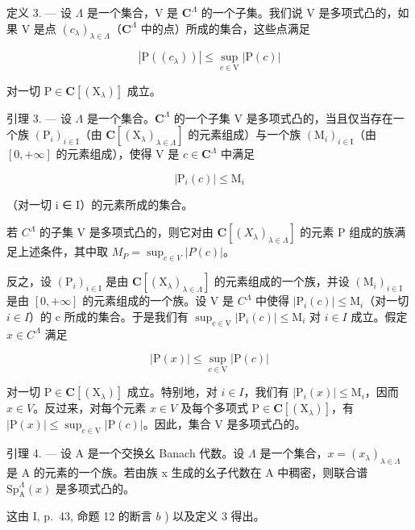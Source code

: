 定义 3. --- 设 \(\Lambda\) 是一个集合，V 是 \(\mathbf{C}^{\Lambda}\) 的一个子集。我们说 V 是多项式凸的，如果 V 是点 \((c_{\lambda})_{\lambda \in \Lambda}\)（\(\mathbf{C}^{\Lambda}\) 中的点）所成的集合，这些点满足

\[
| \mathrm{P} ((c _ {\lambda})) | \leqslant \sup _ {c \in \mathrm{V}} | \mathrm{P} (c) |
\]

对一切 \(\mathrm{P}\in \mathbf{C}[(\mathrm{X}_{\lambda})]\) 成立。

引理 3. --- 设 \(\Lambda\) 是一个集合。\(\mathbf{C}^{\Lambda}\) 的一个子集 V 是多项式凸的，当且仅当存在一个族 \((\mathrm{P}_i)_{i\in \mathrm{I}}\)（由 \(\mathbf{C}[(\mathrm{X}_{\lambda})_{\lambda \in \Lambda}]\) 的元素组成）与一个族 \((\mathrm{M}_i)_{i\in \mathrm{I}}\)（由 \([0, +\infty]\) 的元素组成），使得 V 是 \(c\in \mathbf{C}^{\Lambda}\) 中满足

\[
| \mathrm{P} _ {i} (c) | \leqslant \mathrm{M} _ {i}
\]

（对一切 i ∈ I）的元素所成的集合。

若 \(C^{\Lambda}\) 的子集 V 是多项式凸的，则它对由 \(\mathbf{C}[(X_{\lambda})_{\lambda\in\Lambda}]\) 的元素 P 组成的族满足上述条件，其中取 \(M_{P}=\sup_{c\in V}|P(c)|\)。

反之，设 \((\mathrm{P}_{i})_{i\in\mathrm{I}}\) 是由 \(\mathbf{C}[(\mathrm{X}_{\lambda})_{\lambda\in\Lambda}]\) 的元素组成的一个族，并设 \((\mathrm{M}_{i})_{i\in\mathrm{I}}\) 是由 \([0,+\infty]\) 的元素组成的一个族。设 V 是 \(C^{\Lambda}\) 中使得 \(|\mathrm{P}_{i}(c)|\leqslant\mathrm{M}_{i}\)（对一切 \(i\in I\)）的 c 所成的集合。于是我们有 \(\sup_{c\in\mathrm{V}}|\mathrm{P}_{i}(c)|\leqslant\mathrm{M}_{i}\) 对 \(i\in I\) 成立。假定 \(x\in C^{\Lambda}\) 满足

\[
| \mathrm{P} (x) | \leqslant \sup _ {c \in \mathrm{V}} | \mathrm{P} (c) |
\]

对一切 \(\mathrm{P}\in\mathbf{C}[(\mathrm{X}_{\lambda})]\) 成立。特别地，对 \(i\in I\)，我们有 \(|\mathrm{P}_{i}(x)|\leqslant\mathrm{M}_{i}\)，因而 \(x\in V\)。反过来，对每个元素 \(x\in V\) 及每个多项式 \(\mathrm{P}\in\mathbf{C}[(\mathrm{X}_{\lambda})]\)，有 \(|\mathrm{P}(x)|\leqslant\sup_{c\in\mathrm{V}}|\mathrm{P}(c)|\)。因此，集合 V 是多项式凸的。

引理 4. --- 设 A 是一个交换幺 Banach 代数。设 \(\Lambda\) 是一个集合，\(x = (x_{\lambda})_{\lambda \in \Lambda}\) 是 A 的元素的一个族。若由族 x 生成的幺子代数在 A 中稠密，则联合谱 \(\mathrm{Sp}_{\mathrm{A}}^{\Lambda}(x)\) 是多项式凸的。

这由 I, p.~43, 命题 12 的断言 \(b\) ) 以及定义 3 得出。

